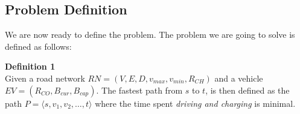 \subsection{Problem Definition} %
\label{sub:problem_definition}
We are now ready to define the problem. The problem we are going to solve is defined as follows:

\textbf{Definition 1}\\
Given a road network \(RN=(V,E,D,v_{max},v_{min},R_{CH})\) and a vehicle $EV=(R_{CO},B_{cur},B_{cap})$. The fastest path from $s$ to $t$, is then defined as the path $P = \langle s,v_1,v_2,\dots,t \rangle$ where the time spent \emph{driving and charging} is minimal.
